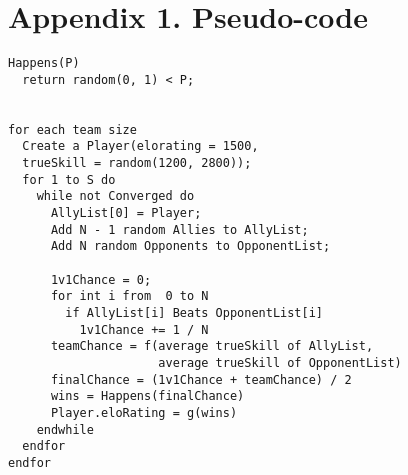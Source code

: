 \documentclass[12pt]{article}
\begin{document}
\clearpage

\section*{Appendix 1. Pseudo-code}
\begin{lstlisting}[frame=single] 
Happens(P)
  return random(0, 1) < P;
  

for each team size
  Create a Player(elorating = 1500, 
  trueSkill = random(1200, 2800));
  for 1 to S do
    while not Converged do
      AllyList[0] = Player;
      Add N - 1 random Allies to AllyList;
      Add N random Opponents to OpponentList;

      1v1Chance = 0;
      for int i from  0 to N
        if AllyList[i] Beats OpponentList[i]
          1v1Chance += 1 / N
      teamChance = f(average trueSkill of AllyList, 
                     average trueSkill of OpponentList)
      finalChance = (1v1Chance + teamChance) / 2
      wins = Happens(finalChance)
      Player.eloRating = g(wins)
    endwhile
  endfor
endfor
\end{lstlisting}
\end{document}
